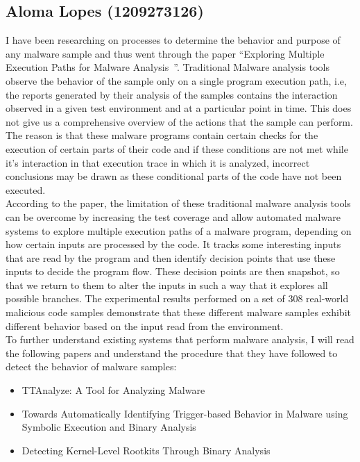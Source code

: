 \documentclass[11pt]{article}
\begin{document}
		\subsection{Aloma Lopes (1209273126)}
		I have been researching on processes to determine the behavior and purpose of any malware sample and thus went through the paper “Exploring Multiple Execution Paths for Malware Analysis~\cite{moser2007exploring}”. Traditional Malware analysis tools observe the behavior of the sample only on a single program execution path, i.e, the reports generated by their analysis of the samples contains the interaction observed in a given test environment and at a particular point in time. This does not give us a comprehensive overview of the actions that the sample can perform. The reason is that these malware programs contain certain checks for the execution of certain parts of their code and if these conditions are not met while it’s interaction in that execution trace in which it is analyzed, incorrect conclusions may be drawn as these conditional parts of the code have not been executed.\\
		According to the paper, the limitation of these traditional malware analysis tools can be overcome by increasing the test coverage and allow automated malware systems to explore multiple execution paths of a malware program, depending on how certain inputs are processed by the code. It tracks some interesting inputs that are read by the program and then identify decision points that use these inputs to decide the program flow. These decision points are then snapshot, so that we return to them to alter the inputs in such a way that it explores all possible branches. The experimental results performed on a set of 308 real-world malicious code samples demonstrate that these different malware samples exhibit different behavior based on the input read from the environment.\\
		To further understand existing systems that perform malware analysis, I will read the following papers and understand the procedure that they have followed to detect the behavior of malware samples:
		\begin{itemize}[noitemsep]
			\item TTAnalyze: A Tool for Analyzing Malware~\cite{bayer2006ttanalyze}
			\item Towards Automatically Identifying Trigger-based Behavior in Malware using Symbolic Execution and Binary Analysis~\cite{brumley2008automatically}
			\item Detecting Kernel-Level Rootkits Through Binary Analysis~\cite{kruegel2004detecting}
		\end{itemize}
	
\end{document}
